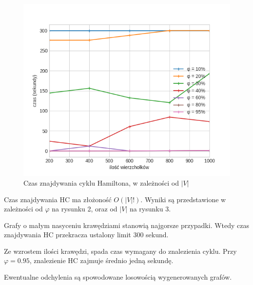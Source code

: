 \documentclass[11pt,twocolumn]{article}
\begin{document}
\begin{figure}[h!]
	\includegraphics[width=\linewidth]{hamil.png}
	\caption{Czas znajdywania cyklu Hamiltona, w zależności od $|V|$ \label{hamil}}
\end{figure}

Czas znajdywania HC ma złożoność $O(|V|!)$.
Wyniki są przedstawione w zależności od $\varphi$ na rysunku 2,
oraz od $|V|$ na rysunku 3.

Grafy o małym nasyceniu krawędziami stanowią najgorsze przypadki.
Wtedy czas znajdywania HC przekracza ustalony limit $300$ sekund.

Ze wzrostem ilości krawędzi, spada czas wymagany do znalezienia cyklu.
Przy $\varphi = 0.95$, znalezienie HC zajmuje średnio jedną sekundę.

Ewentualne odchylenia są spowodowane losowością wygenerowanych grafów.
\end{document}
